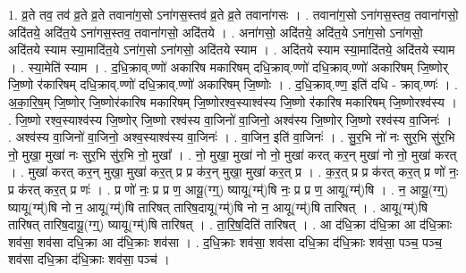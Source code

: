 \documentclass[17pt]{extarticle}
\begin{document}
1. व्र॒ते तव॒ तव॑ व्र॒ते व्र॒ते तवाना॑ग॒सो ऽना॑गस॒स्तव॑ व्र॒ते व्र॒ते तवाना॑गसः । . तवाना॑ग॒सो ऽना॑गस॒स्तव॒ तवाना॑गसो॒ अदि॑तये॒ अदि॑त॒ये ऽना॑गस॒स्तव॒ तवाना॑गसो॒ अदि॑तये । . अना॑गसो॒ अदि॑तये॒ अदि॑त॒ये ऽना॑ग॒सो ऽना॑गसो॒ अदि॑तये स्याम स्या॒मादि॑त॒ये ऽना॑ग॒सो ऽना॑गसो॒ अदि॑तये स्याम । . अदि॑तये स्याम स्या॒मादि॑तये॒ अदि॑तये स्याम । . स्या॒मेति॑ स्याम । . द॒धि॒क्राव्.ण्णो॑ अकारिष मकारिषम् दधि॒क्राव्.ण्णो॑ दधि॒क्राव्.ण्णो॑ अकारिषम् जि॒ष्णोर् जि॒ष्णो र॑कारिषम् दधि॒क्राव्.ण्णो॑ दधि॒क्राव्.ण्णो॑ अकारिषम् जि॒ष्णोः । . द॒धि॒क्राव्.ण्ण॒ इति॑ दधि - क्राव्.ण्णः॑ । . अ॒का॒रि॒ष॒म् जि॒ष्णोर् जि॒ष्णोर॑कारिष मकारिषम् जि॒ष्णोरश्व॒स्याश्व॑स्य जि॒ष्णो र॑कारिष मकारिषम् जि॒ष्णोरश्व॑स्य । . जि॒ष्णो रश्व॒स्याश्व॑स्य जि॒ष्णोर् जि॒ष्णो रश्व॑स्य वा॒जिनो॑ वा॒जिनो॒ अश्व॑स्य जि॒ष्णोर् जि॒ष्णो रश्व॑स्य वा॒जिनः॑ । . अश्व॑स्य वा॒जिनो॑ वा॒जिनो॒ अश्व॒स्याश्व॑स्य वा॒जिनः॑ । . वा॒जिन॒ इति॑ वा॒जिनः॑ । . सु॒र॒भि नो॑ नः सुर॒भि सु॑र॒भि नो॒ मुखा॒ मुखा॑ नः सुर॒भि सु॑र॒भि नो॒ मुखा᳚ । . नो॒ मुखा॒ मुखा॑ नो नो॒ मुखा॑ करत् कर॒न् मुखा॑ नो नो॒ मुखा॑ करत् । . मुखा॑ करत् कर॒न् मुखा॒ मुखा॑ कर॒त् प्र प्र क॑र॒न् मुखा॒ मुखा॑ कर॒त् प्र । . क॒र॒त् प्र प्र क॑रत् कर॒त् प्र णो॑ नः॒ प्र क॑रत् कर॒त् प्र णः॑ । . प्र णो॑ नः॒ प्र प्र ण॒ आयू॒(ग्ग्॒) ष्यायू(ग्म्॑)षि नः॒ प्र प्र ण॒ आयू(ग्म्॑)षि । . न॒ आयू॒(ग्ग्॒) ष्यायू(ग्म्॑)षि नो न॒ आयू(ग्म्॑)षि तारिषत् तारिष॒दायू(ग्म्॑)षि नो न॒ आयू(ग्म्॑)षि तारिषत् । . आयू(ग्म्॑)षि तारिषत् तारिष॒दायू॒(ग्ग्॒) ष्यायू(ग्म्॑)षि तारिषत् । . ता॒रि॒ष॒दिति॑ तारिषत् । . आ द॑धि॒क्रा द॑धि॒क्रा आ द॑धि॒क्राः शव॑सा॒ शव॑सा दधि॒क्रा आ द॑धि॒क्राः शव॑सा । . द॒धि॒क्राः शव॑सा॒ शव॑सा दधि॒क्रा द॑धि॒क्राः शव॑सा॒ पञ्च॒ पञ्च॒ शव॑सा दधि॒क्रा द॑धि॒क्राः शव॑सा॒ पञ्च॑ । \newline
\end{document}
